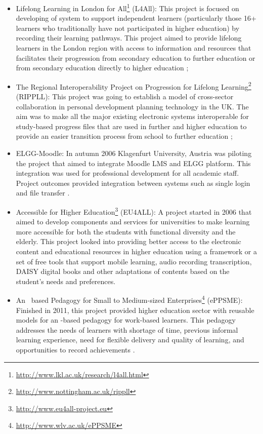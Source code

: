 \begin{itemize}
  \item Lifelong Learning in London for
  All\footnote{\url{http://www.lkl.ac.uk/research/l4all.html}} (L4All): This
  project is focused on developing of \LLLs system to support independent
  learners (particularly those 16+ learners who traditionally have not
  participated in higher education) by recording their learning pathways. This
  project aimed to provide lifelong learners in the London region with access to
  information and resources that facilitates their progression from secondary
  education to further education or from secondary education directly to higher
  education \citep{Freitas2006};

  \item The Regional Interoperability Project on Progression for Lifelong
  Learning\footnote{\url{http://www.nottingham.ac.uk/rippll}} (RIPPLL): This
  project was going to establish a model of cross-sector collaboration in
  personal development planning technology in the UK. The aim was to make all
  the major existing electronic systems interoperable for study-based progress
  files that are used in further and higher education to provide an easier
  transition process from school to further education \citep{Hartnell-Young2006};

  \item ELGG-Moodle: In autumn 2006 Klagenfurt University, Austria was piloting
  the project that aimed to integrate Moodle LMS and ELGG platform. This
  integration was used for professional development for all academic staff.
  Project outcomes provided integration between systems such as single login and
  file transfer \citep{Attwell2007}.

  \item Accessible \LLLc for Higher
  Education\footnote{\url{http://www.eu4all-project.eu}} (EU4ALL): A project
  started in 2006 that aimed to develop components and services for universities
  to make learning more accessible for both the students with functional
  diversity and the elderly. This project looked into providing better access
  to the electronic content and educational resources in higher education using
  a framework or a set of free tools that support mobile learning, audio
  recording transcription, DAISY digital books and other adaptations of contents
  based on the student's needs and preferences.

  \item An \ep~based Pedagogy for Small to Medium-sized
  Enterprises\footnote{\url{http://www.wlv.ac.uk/ePPSME}} (ePPSME): Finished
  in 2011, this project provided higher education sector with reusable models
  for an \ep-based pedagogy for work-based learners. This pedagogy addresses
  the needs of learners with shortage of time, previous informal learning
  experience, need for flexible delivery and quality of learning, and
  opportunities to record achievements \citep{Felce2011}.
  

\end{itemize}
